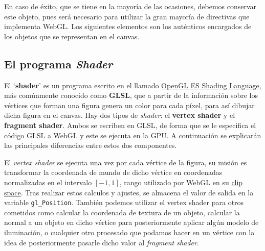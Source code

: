 En caso de éxito, que se tiene en la mayoría de las ocasiones, debemos conservar este objeto, pues será necesario para utilizar la gran mayoría de directivas que implementa WebGL. Los siguientes elementos son los auténticos encargados de los objetos que se representan en el canvas.

\subsection{El programa \textit{Shader}}

El `\textbf{shader}' es un programa escrito en el llamado \href{https://www.khronos.org/registry/OpenGL/specs/es/3.2/GLSL_ES_Specification_3.20.pdf}{OpenGL ES Shading Language}, más comúnmente conocido como \textbf{GLSL}, que a partir de la información sobre los vértices que forman una figura genera un color para cada píxel, para así dibujar dicha figura en el canvas. Hay dos tipos de \textit{shader}: el \textbf{vertex shader} y el \textbf{fragment shader}. Ambos se escriben en GLSL, de forma que se le especifica el código GLSL a WebGL y este se ejecuta en la GPU. A continuación se explicarán las principales diferencias entre estos dos componentes.

El \textit{vertex shader} se ejecuta una vez por cada vértice de la figura, su misión es transformar la coordenada de mundo de dicho vértice en coordenadas normalizadas en el intervalo $[-1,1]$, rango utilizado por WebGL en su \href{https://developer.mozilla.org/en-US/docs/Web/API/WebGL_API/WebGL_model_view_projection#clip_space}{clip space}. Tras realizar estos calculos y ajustes, se almacena el valor de salida en la variable \verb|gl_Position|. También podemos utilizar el vertex shader para otros cometidos como calcular la coordenada de textura de un objeto, calcular la normal a un objeto en dicho vértice para posteriormente aplicar algún modelo de iluminación, o cualquier otro procesado que podamos hacer en un vértice con la idea de posteriormente pasarle dicho valor al \textit{fragment shader}.


